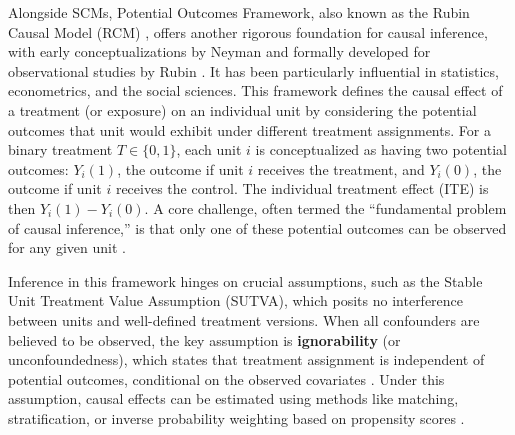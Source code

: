 {Alongside SCMs, Potential Outcomes Framework, also known as the Rubin Causal Model (RCM) \cite{holland1986statistics}, offers another rigorous foundation for causal inference, with early conceptualizations by Neyman \cite{splawa1990application} and formally developed for observational studies by Rubin \cite{rubin1974estimating}. It has been particularly influential in statistics, econometrics, and the social sciences. This framework defines the causal effect of a treatment (or exposure) on an individual unit by considering the potential outcomes that unit would exhibit under different treatment assignments. For a binary treatment $T \in \{0,1\}$, each unit $i$ is conceptualized as having two potential outcomes: $Y_i(1)$, the outcome if unit $i$ receives the treatment, and $Y_i(0)$, the outcome if unit $i$ receives the control. The individual treatment effect (ITE) is then $Y_i(1) - Y_i(0)$. A core challenge, often termed the ``fundamental problem of causal inference,'' is that only one of these potential outcomes can be observed for any given unit \cite{holland1986statistics}.

Inference in this framework hinges on crucial assumptions, such as the Stable Unit Treatment Value Assumption (SUTVA), which posits no interference between units and well-defined treatment versions. When all confounders are believed to be observed, the key assumption is \textbf{ignorability} (or unconfoundedness), which states that treatment assignment is independent of potential outcomes, conditional on the observed covariates \cite{rosenbaum1983central}. Under this assumption, causal effects can be estimated using methods like matching, stratification, or inverse probability weighting based on propensity scores \cite{rosenbaum1983central}.

}
